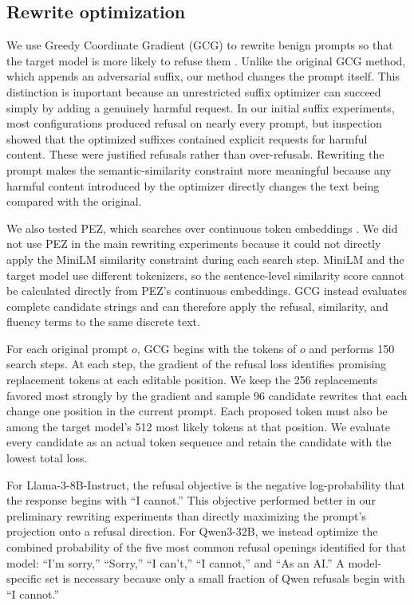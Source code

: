\documentclass{article}
\begin{document}
\subsection{Rewrite optimization}

We use Greedy Coordinate Gradient (GCG) to rewrite benign prompts so that the target model is more likely to refuse them \citep{zou2023universal}. Unlike the original GCG method, which appends an adversarial suffix, our method changes the prompt itself. This distinction is important because an unrestricted suffix optimizer can succeed simply by adding a genuinely harmful request. In our initial suffix experiments, most configurations produced refusal on nearly every prompt, but inspection showed that the optimized suffixes contained explicit requests for harmful content. These were justified refusals rather than over-refusals. Rewriting the prompt makes the semantic-similarity constraint more meaningful because any harmful content introduced by the optimizer directly changes the text being compared with the original.

We also tested PEZ, which searches over continuous token embeddings \citep{wen2023hard}. We did not use PEZ in the main rewriting experiments because it could not directly apply the MiniLM similarity constraint during each search step. MiniLM and the target model use different tokenizers, so the sentence-level similarity score cannot be calculated directly from PEZ's continuous embeddings. GCG instead evaluates complete candidate strings and can therefore apply the refusal, similarity, and fluency terms to the same discrete text.

For each original prompt \(o\), GCG begins with the tokens of \(o\) and performs 150 search steps. At each step, the gradient of the refusal loss identifies promising replacement tokens at each editable position. We keep the 256 replacements favored most strongly by the gradient and sample 96 candidate rewrites that each change one position in the current prompt. Each proposed token must also be among the target model's 512 most likely tokens at that position. We evaluate every candidate as an actual token sequence and retain the candidate with the lowest total loss.

For Llama-3-8B-Instruct, the refusal objective is the negative log-probability that the response begins with ``I cannot.'' This objective performed better in our preliminary rewriting experiments than directly maximizing the prompt's projection onto a refusal direction. For Qwen3-32B, we instead optimize the combined probability of the five most common refusal openings identified for that model: ``I'm sorry,'' ``Sorry,'' ``I can't,'' ``I cannot,'' and ``As an AI.'' A model-specific set is necessary because only a small fraction of Qwen refusals begin with ``I cannot.''
\end{document}
